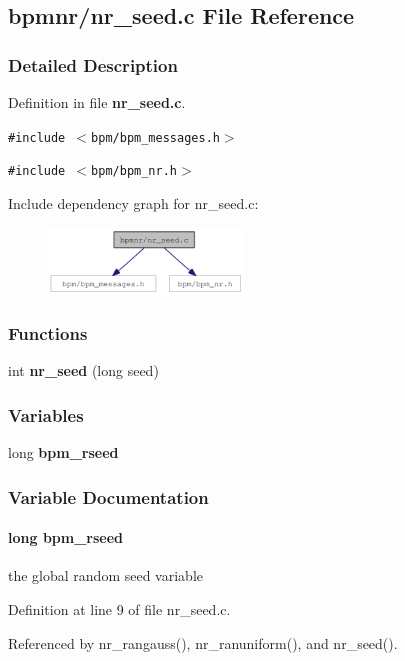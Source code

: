 \subsection{bpmnr/nr\_\-seed.c File Reference}
\label{nr__seed_8c}


\subsubsection{Detailed Description}


Definition in file {\bf nr\_\-seed.c}.

{\tt \#include $<$bpm/bpm\_\-messages.h$>$}\par
{\tt \#include $<$bpm/bpm\_\-nr.h$>$}\par


Include dependency graph for nr\_\-seed.c:\nopagebreak
\begin{figure}[H]
\begin{center}
\leavevmode
\includegraphics[width=147pt]{nr__seed_8c__incl}
\end{center}
\end{figure}
\subsubsection*{Functions}
\begin{CompactItemize}
\item 
int {\bf nr\_\-seed} (long seed)
\end{CompactItemize}
\subsubsection*{Variables}
\begin{CompactItemize}
\item 
long {\bf bpm\_\-rseed}
\end{CompactItemize}


\subsubsection{Variable Documentation}
\paragraph[bpm\_\-rseed]{\setlength{\rightskip}{0pt plus 5cm}long {\bf bpm\_\-rseed}}\hfill\label{nr__seed_8c_c988f9e1a0efc51f61aa8731b011a44b}


the global random seed variable 

Definition at line 9 of file nr\_\-seed.c.

Referenced by nr\_\-rangauss(), nr\_\-ranuniform(), and nr\_\-seed().